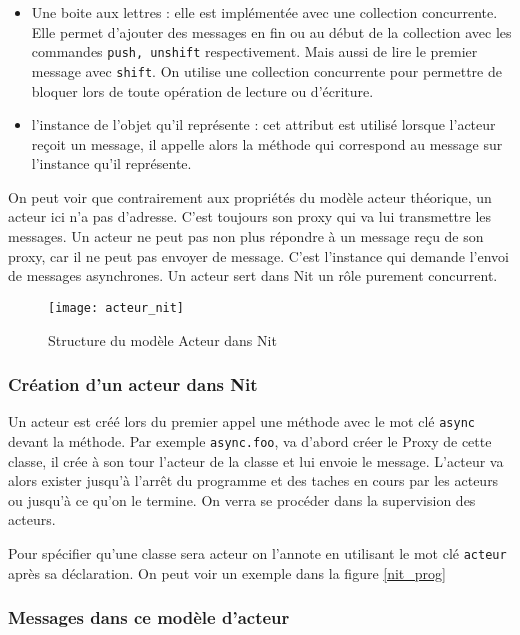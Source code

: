\documentclass[11pt, a4paper]{article}
\begin{document}
\begin{itemize}
\item Une boite aux lettres : elle est implémentée avec une collection concurrente. Elle permet d'ajouter des messages en fin ou au début de la collection avec les commandes \texttt{push, unshift} respectivement. Mais aussi de lire le premier message avec \texttt{shift}. On utilise une collection concurrente pour permettre de bloquer lors de toute opération de lecture ou d'écriture.
\item l'instance de l'objet qu'il représente : cet attribut est utilisé lorsque l'acteur reçoit un message, il appelle alors la méthode qui correspond au message sur l'instance qu'il représente.
\end{itemize}
On peut voir que contrairement aux propriétés du modèle acteur théorique, un acteur ici n'a pas d'adresse. C'est toujours son proxy qui va lui transmettre les messages. Un acteur ne peut pas non plus répondre à un message reçu de son proxy, car il ne peut pas envoyer de message. C'est l'instance qui demande l'envoi de messages asynchrones. Un acteur sert dans Nit un rôle purement concurrent.

\begin{figure}
\centering
\texttt{[image: acteur\_nit]}
\caption{\label{acteur_nit}Structure du modèle Acteur dans Nit }
\end{figure}

\subsubsection{Création d'un acteur dans Nit}
\par Un acteur est créé lors du premier appel une méthode avec le mot clé \texttt{async} devant la méthode. Par exemple \texttt{async.foo}, va d'abord créer le Proxy de cette classe, il crée à son tour l'acteur de la classe et lui envoie le message. L'acteur va alors exister jusqu'à l'arrêt du programme et des taches en cours par les acteurs ou jusqu'à ce qu'on le termine. On verra se procéder dans la supervision des acteurs.
\par Pour spécifier qu'une classe sera acteur on l'annote en utilisant le mot clé \texttt{acteur} après sa déclaration. On peut voir un exemple dans la figure \ref{nit_prog}

\subsubsection{Messages dans ce modèle d'acteur}
\end{document}
